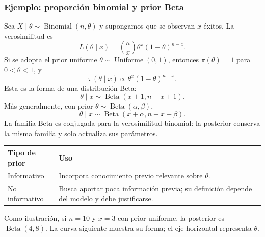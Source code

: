 \subsubsection{Ejemplo: proporción binomial y prior Beta}

Sea $X\mid\theta\sim\operatorname{Binomial}(n,\theta)$ y supongamos que se observan $x$ éxitos. La verosimilitud es
\[
  L(\theta\mid x)={\binom{n}{x}}\theta^x(1-\theta)^{n-x}.
\]
Si se adopta el prior uniforme $\theta\sim\operatorname{Uniforme}(0,1)$, entonces $\pi(\theta)=1$ para $0<\theta<1$, y
\[
  \pi(\theta\mid x)\propto\theta^x(1-\theta)^{n-x}.
\]
Esta es la forma de una distribución Beta:
\[
  \theta\mid x\sim\operatorname{Beta}(x+1,n-x+1).
\]
Más generalmente, con prior $\theta\sim\operatorname{Beta}(\alpha,\beta)$,
\[
  \theta\mid x\sim\operatorname{Beta}(x+\alpha,n-x+\beta).
\]
La familia Beta es conjugada para la verosimilitud binomial: la posterior conserva la misma familia y solo actualiza sus parámetros.

\begin{center}
\begin{tabularx}{0.96\linewidth}{@{}lX@{}}
  \toprule
  Tipo de prior & Uso\\
  \midrule
  Informativo & Incorpora conocimiento previo relevante sobre $\theta$.\\
  No informativo & Busca aportar poca información previa; su definición depende del modelo y debe justificarse.\\
  \bottomrule
\end{tabularx}
\end{center}

Como ilustración, si $n=10$ y $x=3$ con prior uniforme, la posterior es $\operatorname{Beta}(4,8)$. La curva siguiente muestra su forma; el eje horizontal representa $\theta$.

\begin{center}
\end{center}

